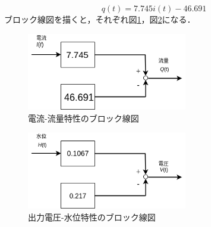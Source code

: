 \documentclass[12pt]{jsarticle}
\begin{document}
\begin{equation}
  q(t) = 7.745i(t) - 46.691
\end{equation}
ブロック線図を描くと，それぞれ図\ref{BlockDiagIQ}，図\ref{BlockDiagVH}になる．
\begin{figure}[tb]
  \begin{center}
    \includegraphics[clip,width=7.0cm]{../img/BlockDiagIQ.png}
    \caption{電流-流量特性のブロック線図}
    \label{BlockDiagIQ}
  \end{center}
\end{figure}
\begin{figure}[tb]
  \begin{center}
    \includegraphics[clip,width=7.0cm]{../img/BlockDiagHV.png}
    \caption{出力電圧-水位特性のブロック線図}
    \label{BlockDiagVH}
  \end{center}
\end{figure}
\end{document}
